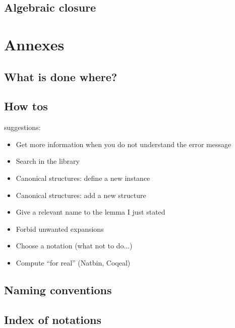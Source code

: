 \documentclass{book}
\begin{document}
\chapter{Algebraic closure}

\part{Annexes}

\chapter{What is done where?}

\chapter{How tos}
suggestions:
\begin{itemize}
\item Get more information when you do not understand the error
  message
\item Search in the library
\item Canonical structures: define a new instance
\item Canonical structures: add a new structure
\item Give a relevant name to the lemma I just stated
\item Forbid unwanted expansions
\item Choose a notation (what not to do...)
\item Compute ``for real'' (Natbin, Coqeal)
\end{itemize}
\chapter{Naming conventions}

\chapter{Index of notations}
\end{document}
